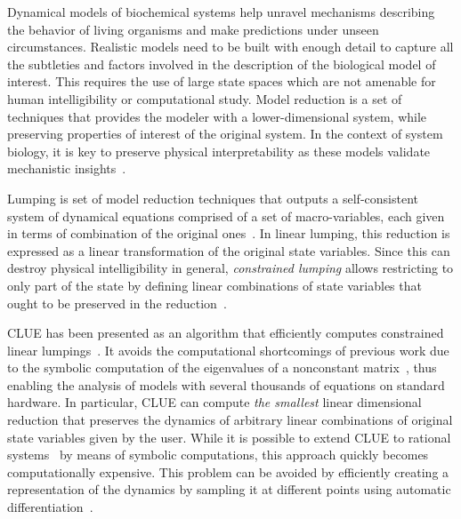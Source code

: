 
Dynamical models of biochemical systems help unravel mechanisms describing the behavior of living organisms and make predictions under unseen circumstances.
Realistic models need to be built with enough detail to capture all the subtleties and factors involved in the description of the biological model of interest.
This requires the use of large state spaces which are not amenable for human intelligibility or computational study.
Model reduction is a set of techniques that provides the modeler with a lower-dimensional system, while preserving properties of interest of the original system.
In the context of system biology, it is key to preserve physical interpretability as these models validate mechanistic insights~\cite{10.1093/bioinformatics/btn035,21899762,Apri201216}.


Lumping is set of model reduction techniques that outputs a self-consistent system of dynamical equations comprised of a set of macro-variables, each given in terms of combination of the original ones~\cite{okino1998,Snowden:2017aa,DBLP:conf/qest/GrossmannKBW18,backenkohler2021abstraction,DBLP:journals/pe/AbateACK21}.
In linear lumping, this reduction is expressed as a linear transformation of the original state variables.
Since this can destroy physical intelligibility in general, \emph{constrained lumping} allows restricting to only part of the state by defining linear combinations of state variables that ought to be preserved in the reduction~\cite{LI199195}.


CLUE has been presented as an algorithm that efficiently computes constrained linear lumpings~\cite{ovchinnikov_clue_2021}.
It avoids the computational shortcomings of previous work due to the symbolic computation of the eigenvalues of a nonconstant matrix~\cite{LiRabitz,LI199195}, thus enabling the analysis of models with several thousands of equations on standard hardware.
In particular, CLUE can compute \emph{the smallest} linear dimensional reduction that preserves the dynamics of arbitrary linear combinations of original state variables given by the user.
While it is possible to extend CLUE to rational systems~\cite{jimenez_clue_2022} by means of symbolic computations, this approach quickly becomes computationally expensive.
This problem can be avoided by efficiently creating a representation of the dynamics by sampling it at different points using automatic differentiation~\cite{jimenez_clue_2022}.


